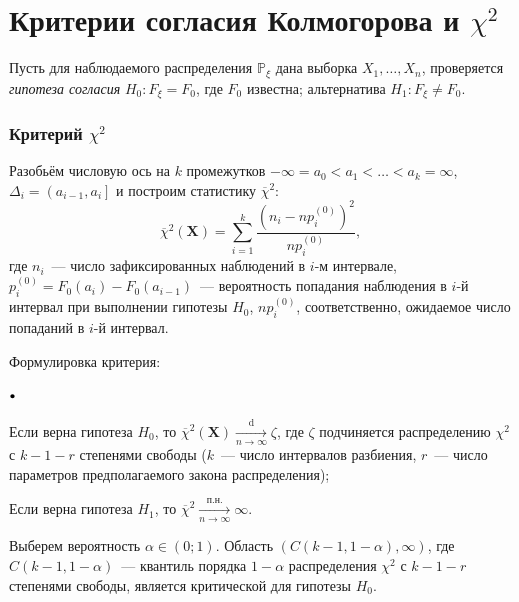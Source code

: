 \documentclass[oneside,final,14pt]{extreport}
\theoremstyle{plain}
\theoremstyle{definition}
\theoremstyle{named}
\newcommand\sbullet[1][.5]{\mathbin{\vcenter{\hbox{\scalebox{#1}{$\bullet$}}}}}
\newenvironment{compactlist}{
\begin{list}{{$\sbullet[.75]$}}{
\setlength\partopsep{0pt}
\setlength\parskip{0pt}
\setlength\parsep{0pt}
\setlength\topsep{0pt}
\setlength\itemsep{0pt}
}
}{
\end{list}
}
\begin{document}
\section{Критерии согласия Колмогорова и $\chi^{2}$}

Пусть для наблюдаемого распределения $\mathbb{P}_{\xi}$ дана выборка $X_1, \ldots, X_n$, проверяется {\it гипотеза согласия} $H_{0}: F_{\xi}=F_{0}$, где $F_{0}$ известна; альтернатива $H_{1}: F_{\xi} \neq F_{0}$.

\subsubsection{Критерий $\chi^{2}$}
Разобьём числовую ось на $k$ промежутков ${-\infty=a_{0}<a_{1}<\ldots<a_{k}=\infty}$, ${\Delta_{i}=\left(a_{i-1}, a_{i}\right]}$ и построим статистику $\overline{\chi}^{2}$:
\begin{equation*}
    \overline{\chi}^{2}(\mathbf{X})=\sum\limits_{i=1}^{k} \frac{\left(n_{i}-n p_{i}^{(0)}\right)^{2}}{n p_{i}^{(0)}},
\end{equation*}
где $n_i$~--- число зафиксированных наблюдений в $i$-м интервале,
$p_{i}^{(0)}=F_{0}\left(a_{i}\right)-F_{0}\left(a_{i-1}\right)$~--- вероятность попадания наблюдения в $i$-й интервал при выполнении гипотезы $H_0$, $n p_{i}^{(0)}$, соответственно, ожидаемое число попаданий в $i$-й интервал.

Формулировка критерия:
\begin{compactlist}
    \item Если верна гипотеза $H_0$, то $\overline{\chi}^{2}\left(\mathbf{X}\right) \xrightarrow[n \to \infty]{\text{d}} \zeta$, где $\zeta$ подчиняется распределению $\chi^{2}$ с $k-1-r$ степенями свободы ($k$~--- число интервалов разбиения, $r$~--- число параметров предполагаемого закона распределения);
    \item Если верна гипотеза $H_1$, то $\overline{\chi}^{2} \xrightarrow[n \to \infty]{\text{п.н.}} \infty$.
\end{compactlist}

Выберем вероятность $\alpha \in (0;1)$. Область $(C(k-1,1-\alpha), \infty)$, где $C(k-1,1-\alpha)$~--- квантиль порядка $1-\alpha$ распределения $\chi^{2}$ с $k-1-r$ степенями свободы, является критической для гипотезы $H_0$.
\end{document}
